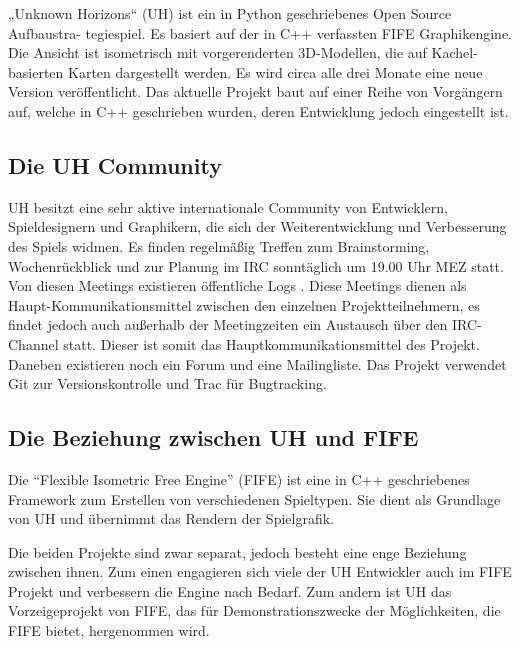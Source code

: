„Unknown Horizons“ (UH) \cite{uh} ist ein in Python geschriebenes Open Source Aufbaustra-
tegiespiel. Es basiert auf der in C++
verfassten FIFE Graphikengine. Die Ansicht ist isometrisch mit vorgerenderten 3D-Modellen,
die auf Kachel-basierten Karten dargestellt werden. Es wird circa alle drei Monate eine neue Version
veröffentlicht. Das aktuelle Projekt baut auf einer Reihe von Vorgängern auf, welche
in C++ geschrieben wurden, deren Entwicklung jedoch eingestellt ist.

\subsection{Die UH Community}
UH besitzt eine sehr aktive internationale Community von Entwicklern, Spieldesignern und Graphikern, die
sich der Weiterentwicklung und Verbesserung des Spiels widmen.
Es finden regelmäßig Treffen zum Brainstorming, Wochenrückblick
und zur Planung im IRC sonntäglich um 19.00 Uhr MEZ statt. Von diesen Meetings existieren
öffentliche Logs \cite{uhlogs}.
Diese Meetings dienen als Haupt-Kommunikationsmittel zwischen den einzelnen Projektteilnehmern,
es findet jedoch auch außerhalb der Meetingzeiten ein Austausch über den  IRC-Channel statt.
Dieser ist somit das
Hauptkommunikationsmittel des Projekt. Daneben existieren noch ein Forum
und eine Mailingliste. Das Projekt verwendet Git zur Versionskontrolle und Trac für
Bugtracking.

\subsection{Die Beziehung zwischen UH und FIFE}
Die \enquote{Flexible Isometric Free Engine} (FIFE) \cite{fife} ist eine in C++ geschriebenes Framework
zum Erstellen von verschiedenen Spieltypen. Sie dient als Grundlage von UH und übernimmt das Rendern
der Spielgrafik.

Die beiden Projekte sind zwar separat, jedoch besteht eine enge Beziehung zwischen ihnen. Zum einen
engagieren sich viele der UH Entwickler auch im FIFE Projekt und verbessern die Engine nach Bedarf.
Zum andern ist UH das Vorzeigeprojekt von FIFE, das für Demonstrationszwecke der
Möglichkeiten, die FIFE bietet, hergenommen wird.

